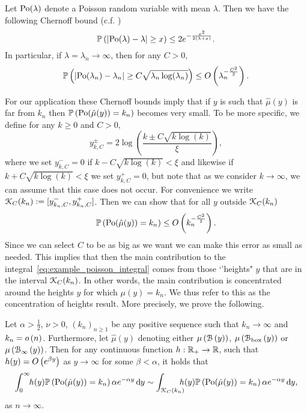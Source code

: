 Let ${\mathrm{Po}}(\lambda)$ denote a Poisson random variable with mean $\lambda$. Then we have the following Chernoff bound (c.f. \cite[Lemma 1.2]{penrose2003random})
\begin{equation}\label{eq:def_chernoff_bound_poisson}
	\mathbb{P}\left(\left|\mathrm{Po}(\lambda) - \lambda\right| \ge x\right) \le 2e^{-\frac{x^2}{2(\lambda + x)}}.
\end{equation}
In particular, if $\lambda = \lambda_n \to \infty$, then for any $C>0$,
\begin{equation}\label{eq:def_chernoff_bound_poisson_C}
	\mathbb{P}\left(\left|\mathrm{Po}(\lambda_n) - \lambda_n\right| \ge C \sqrt{\lambda_n\log(\lambda_n)}\right) \le O\left(\lambda_n^{-\frac{C^2}{2}}\right).
\end{equation}

For our application these Chernoff bounds imply that if $y$ is such that $\hat{\mu}(y)$ is far from $k_n$ then $\mathbb{P}\left({\mathrm{Po}}(\hat{\mu}(y)) = k_n\right)$ becomes very small. To be more specific, we define for any $k \ge 0$ and $C > 0$,
\begin{equation}\label{eq:def_y_k_C}
	y_{k,C}^\pm = 2 \log\left(\frac{k \pm C \sqrt{k \log(k)}}{\xi}\right),
\end{equation}
where we set $y_{k,C}^- = 0$ if $k - C \sqrt{k \log(k)} < \xi$ and likewise if $k + C \sqrt{k \log(k)} < \xi$ we set $y_{k,C}^+=0$, but  note that as we consider $k\rightarrow\infty$, we can assume that this case does not occur. For convenience we write ${\mathcal K}_C(k_n) := [y_{k_n,C}^-, y_{k_n,C}^+]$. Then we can show that for all $y$ outside ${\mathcal K}_C(k_n)$
\begin{equation}\label{eq:chernoff_bound_degrees}
	\mathbb{P}\left({\mathrm{Po}}(\hat{\mu}(y)) = k_n\right) \le O\left(k_n^{-\frac{C^2}{2}}\right).
\end{equation}
Since we can select $C$ to be as big as we want we can make this error as small as needed. This implies that then the main contribution to the integral~\eqref{eq:example_poisson_integral} comes from those `'heights" $y$ that are in the interval ${\mathcal K}_C(k_n)$. In other words, the main contribution is concentrated around the heights $y$ for which $\mu(y) = k_n$. We thus refer to this as the concentration of heights result. More precisely, we prove the following.

\begin{proposition}\label{prop:concentration_height_general}
Let $\alpha > \frac{1}{2}$, $\nu > 0$, $(k_n)_{n \ge 1}$ be any positive sequence such that $k_n \to \infty$ and $k_n = o\left(n\right)$. Furthermore, let $\hat{\mu}(y)$ denoting either $\mu\left({\mathcal B}\left(y\right)\right)$, $\mu\left({\mathcal B}_{\text{box}}\left(y\right)\right)$ or $\mu\left({\mathcal B}_{\infty}\left(y\right)\right)$. Then for any continuous function $h : {\mathbb R}_+ \rightarrow  {\ensuremath{\mathbb R}}$, such that $h(y) = O\left(e^{\beta y}\right)$ as $y \to \infty$ for some $\beta < \alpha$, it holds that
\begin{equation*}%
	\int_0^\infty \hspace{-3pt} h(y) \Prob{\Po(\hat{\mu}(y)) = k_n} \alpha e^{-\alpha y} \dd y
	\sim \int_{\Kcal_C(k_n)} \hspace{-8pt} h(y) \Prob{\Po(\hat{\mu}(y)) = k_n} \alpha e^{-\alpha y} \dd y,
\end{equation*}
as $n \to \infty$.
\end{proposition}



